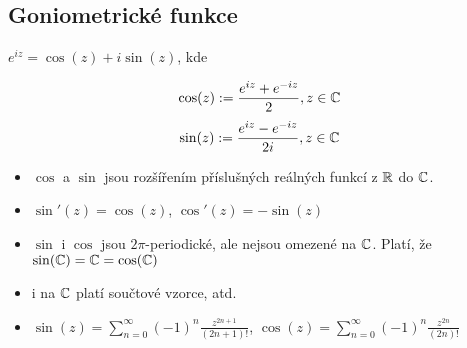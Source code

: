 \subsection{Goniometrické funkce}

$e^{i z}=\cos(z)+i\sin(z)$, kde %

\begin{definition}
\[\cos(z):=\frac{e^{i z}+e^{-i z}}{2}, z\in \operatorname{\mathbb{C}}  \]
\[\sin(z):=\frac{e^{i z}-e^{-i z}}{2i}, z\in \operatorname{\mathbb{C}}  \]
\end{definition}

\begin{properties}
\mbox{}
\vspace{-2em}
\begin{itemize}
    \item $\cos$ a $\sin$ jsou rozšířením příslušných reálných funkcí z $\operatorname{\mathbb{R}} $ do $\operatorname{\mathbb{C}}  $.
    \item $\sin'(z)=\cos(z)$, $\cos'(z)=-\sin(z)$
    \item $\sin$ i $\cos$ jsou $2\pi$-periodické, ale nejsou omezené na $\operatorname{\mathbb{C}}  $. Platí, že $\sin(\operatorname{\mathbb{C}}  )=\operatorname{\mathbb{C}}  =\cos(\operatorname{\mathbb{C}}  )$
    \item i na $\operatorname{\mathbb{C}}  $ platí součtové vzorce, atd.
    \item $\sin(z)=\sum_{n=0}^{\infty}(-1)^n\frac{z^{2n+1}}{(2n+1)!}$, $ 
    \cos(z)=\sum_{n=0}^{\infty}(-1)^n\frac{z^{2n}}{(2n)!}$
\end{itemize}
\end{properties}
